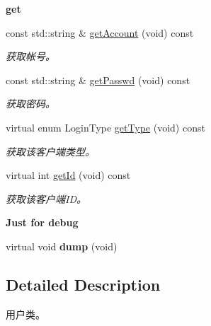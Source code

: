 \begin{Indent}{\bf get}\par
\begin{DoxyCompactItemize}
\item 
const std\-::string \& \hyperlink{classepUser_a2b0e538c375b2306ae37bccd8caf8ed2}{get\-Account} (void) const 
\begin{DoxyCompactList}\small\item\em 获取帐号。 \end{DoxyCompactList}\item 
const std\-::string \& \hyperlink{classepUser_a773d6c1b988f97eeaad23fb170aca93b}{get\-Passwd} (void) const 
\begin{DoxyCompactList}\small\item\em 获取密码。 \end{DoxyCompactList}\item 
virtual enum \-Login\-Type \hyperlink{classepUser_aa445c0b9c0ec07d7fb32b978281402ab}{get\-Type} (void) const 
\begin{DoxyCompactList}\small\item\em 获取该客户端类型。 \end{DoxyCompactList}\item 
virtual int \hyperlink{classepUser_a8fad9dfcf812e6952bba5ad98086d693}{get\-Id} (void) const 
\begin{DoxyCompactList}\small\item\em 获取该客户端\-I\-D。 \end{DoxyCompactList}\end{DoxyCompactItemize}
\end{Indent}
\begin{Indent}{\bf \-Just for debug}\par
\begin{DoxyCompactItemize}
\item 
\hypertarget{classepUser_a831a0789df548f8d8eade686ef7fe22f}{virtual void {\bfseries dump} (void)}\label{classepUser_a831a0789df548f8d8eade686ef7fe22f}

\end{DoxyCompactItemize}
\end{Indent}


\subsection{\-Detailed \-Description}
用户类。 

